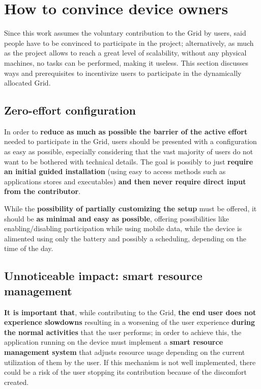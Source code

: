 \section{How to convince device owners}
Since this work assumes the voluntary contribution to the Grid by users, said people have to be convinced to participate in the project; alternatively, as much as the project allows to reach a great level of scalability, without any physical machines, no tasks can be performed, making it useless. This section discusses ways and prerequisites to incentivize users to participate in the dynamically allocated Grid.

\subsection{Zero-effort configuration}
In order to \textbf{reduce as much as possible the barrier of the active effort} needed to participate in the Grid, users should be presented with a configuration as easy as possible, especially considering that the vast majority of users do not want to be bothered with technical details. The goal is possibly to just \textbf{require an initial guided installation} (using easy to access methods such as applications stores and executables) \textbf{and then never require direct input from the contributor}.

While the \textbf{possibility of partially customizing the setup} must be offered, it should be \textbf{as minimal and easy as possible}, offering possibilities like enabling/disabling participation while using mobile data, while the device is alimented using only the battery and possibly a scheduling, depending on the time of the day. 

\subsection{Unnoticeable impact: smart resource management}
\textbf{It is important that}, while contributing to the Grid, \textbf{the end user does not experience slowdowns} resulting in a worsening of the user experience \textbf{during the normal activities} that the user performs; in order to achieve this, the application running on the device must implement a \textbf{smart resource management system} that adjusts resource usage depending on the current utilization of them by the user. If this mechanism is not well implemented, there could be a risk of the user stopping its contribution because of the discomfort created.

